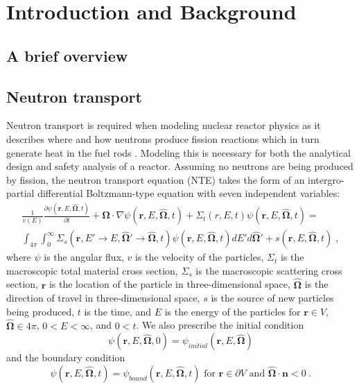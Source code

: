 \chapter{Introduction and Background}


\section {A brief overview}


\section{Neutron transport}
Neutron transport is required when modeling nuclear reactor physics as it describes where and how neutrons produce fission reactions which in turn generate heat in the fuel rods \cite{Duderstadt1971NuclearAnalysis}. Modeling this is necessary for both the analytical design and safety analysis of a reactor. Assuming no neutrons are being produced by fission, the neutron transport equation (NTE) takes the form of an intergro-partial differential Boltzmann-type equation with seven independent variables:
\begin{multline}
    \label{eq:fullNTE}
    \frac{1}{v(E)}\frac{\partial \psi(\boldsymbol{r}, E, \boldsymbol{\hat{\Omega}},t)}{\partial t} + \boldsymbol{\hat{\Omega}} \cdot \nabla \psi(\boldsymbol{r}, E, \boldsymbol{\hat{\Omega}},t) + \Sigma_t(r, E, t) \psi(\boldsymbol{r}, E, \boldsymbol{\hat{\Omega}},t) = \\
    \int_{4\pi}\int_{0}^{\infty}\Sigma_s(\boldsymbol{r}, E'\rightarrow E, \boldsymbol{\hat{\Omega}'} \rightarrow \boldsymbol{\hat{\Omega}}, t)
    \psi(\boldsymbol{r}, E, \boldsymbol{\hat{\Omega}},t) dE' d\boldsymbol{\hat{\Omega}'} +
    s(\boldsymbol{r}, E, \boldsymbol{\hat{\Omega}},t) \;,
\end{multline}
where $\psi$ is the angular flux, $v$ is the velocity of the particles, $\Sigma_t$ is the macroscopic total material cross section, $\Sigma_s$ is the macroscopic scattering cross section, $\boldsymbol{r}$ is the location of the particle in three-dimensional space, $\boldsymbol{\hat{\Omega}}$ is the direction of travel in three-dimensional space, $s$ is the source of new particles being produced, $t$ is the time, and $E$ is the energy of the particles for $\boldsymbol{r} \in V$, $\boldsymbol{\hat{\Omega}} \in 4\pi$, $0<E<\infty$, and $0<t$. We also prescribe the initial condition
\begin{equation}
    \psi(\boldsymbol{r}, E, \boldsymbol{\hat{\Omega}},0) = \psi_{initial}(\boldsymbol{r}, E, \boldsymbol{\hat{\Omega}})
\end{equation}
and the boundary condition
\begin{equation}
    \psi(\boldsymbol{r}, E, \boldsymbol{\hat{\Omega}},t) = \psi_{bound}(\boldsymbol{r}, E, \boldsymbol{\hat{\Omega}},t) \text{ for } \boldsymbol{r} \in \partial V \text{ and } \boldsymbol{\hat{\Omega}} \cdot \boldsymbol{n} < 0 \;.
\end{equation}

